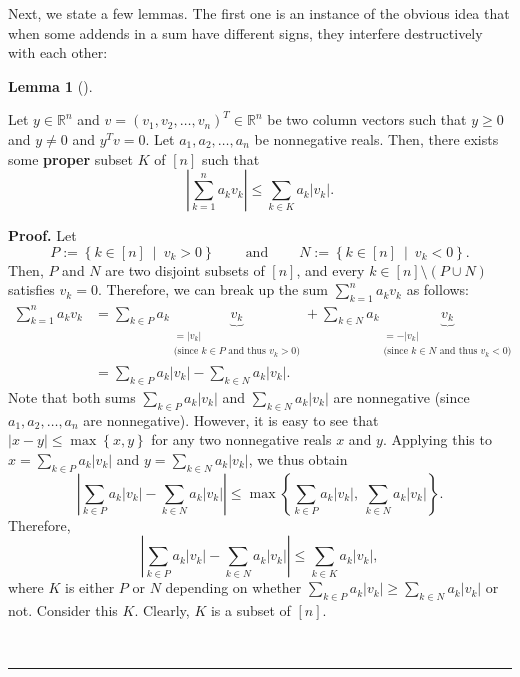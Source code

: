 \documentclass[numbers=enddot,12pt,final,onecolumn,notitlepage]{scrartcl}%
\numberwithin{exer}{subsection}
\theoremstyle{definition}
\newtheorem{lem}[theo]{Lemma}
\newenvironment{lemma}[1][]
{\begin{lem}[#1]\begin{leftbar}}
{\end{leftbar}\end{lem}}
\newenvironment{proof}[1][Proof]{\noindent\textbf{#1.} }{\ \rule{0.5em}{0.5em}}
\let\sumnonlimits\sum
\renewcommand{\sum}{\sumnonlimits\limits}
\begin{document}
Next, we state a few lemmas. The first one is an instance of the obvious idea
that when some addends in a sum have different signs, they interfere
destructively with each other:

\begin{lemma}
\label{lem.posmat.proper-subset}Let $y\in\mathbb{R}^{n}$ and $v=\left(
v_{1},v_{2},\ldots,v_{n}\right)  ^{T}\in\mathbb{R}^{n}$ be two column vectors
such that $y\geq0$ and $y\neq0$ and $y^{T}v=0$. Let $a_{1},a_{2},\ldots,a_{n}$
be nonnegative reals. Then, there exists some \textbf{proper} subset $K$ of
$\left[  n\right]  $ such that%
\[
\left\vert \sum_{k=1}^{n}a_{k}v_{k}\right\vert \leq\sum_{k\in K}%
a_{k}\left\vert v_{k}\right\vert .
\]

\end{lemma}

\begin{proof}
Let
\[
P:=\left\{  k\in\left[  n\right]  \ \mid\ v_{k}>0\right\}
\ \ \ \ \ \ \ \ \ \ \text{and}\ \ \ \ \ \ \ \ \ \ N:=\left\{  k\in\left[
n\right]  \ \mid\ v_{k}<0\right\}  .
\]
Then, $P$ and $N$ are two disjoint subsets of $\left[  n\right]  $, and every
$k\in\left[  n\right]  \setminus\left(  P\cup N\right)  $ satisfies $v_{k}=0$.
Therefore, we can break up the sum $\sum_{k=1}^{n}a_{k}v_{k}$ as follows:%
\begin{align}
\sum_{k=1}^{n}a_{k}v_{k}  &  =\sum_{k\in P}a_{k}\underbrace{v_{k}%
}_{\substack{=\left\vert v_{k}\right\vert \\\text{(since }k\in P\text{ and
thus }v_{k}>0\text{)}}}+\sum_{k\in N}a_{k}\underbrace{v_{k}}%
_{\substack{=-\left\vert v_{k}\right\vert \\\text{(since }k\in N\text{ and
thus }v_{k}<0\text{)}}}\nonumber\\
&  =\sum_{k\in P}a_{k}\left\vert v_{k}\right\vert -\sum_{k\in N}%
a_{k}\left\vert v_{k}\right\vert . \label{pf.lem.posmat.proper-subset.1}%
\end{align}
Note that both sums $\sum_{k\in P}a_{k}\left\vert v_{k}\right\vert $ and
$\sum_{k\in N}a_{k}\left\vert v_{k}\right\vert $ are nonnegative (since
$a_{1},a_{2},\ldots,a_{n}$ are nonnegative). However, it is easy to see that
$\left\vert x-y\right\vert \leq\max\left\{  x,y\right\}  $ for any two
nonnegative reals $x$ and $y$. Applying this to $x=\sum_{k\in P}%
a_{k}\left\vert v_{k}\right\vert $ and $y=\sum_{k\in N}a_{k}\left\vert
v_{k}\right\vert $, we thus obtain%
\[
\left\vert \sum_{k\in P}a_{k}\left\vert v_{k}\right\vert -\sum_{k\in N}%
a_{k}\left\vert v_{k}\right\vert \right\vert \leq\max\left\{  \sum_{k\in
P}a_{k}\left\vert v_{k}\right\vert ,\ \sum_{k\in N}a_{k}\left\vert
v_{k}\right\vert \right\}  .
\]
Therefore,%
\begin{equation}
\left\vert \sum_{k\in P}a_{k}\left\vert v_{k}\right\vert -\sum_{k\in N}%
a_{k}\left\vert v_{k}\right\vert \right\vert \leq\sum_{k\in K}a_{k}\left\vert
v_{k}\right\vert , \label{pf.lem.posmat.proper-subset.2}%
\end{equation}
where $K$ is either $P$ or $N$ depending on whether $\sum_{k\in P}%
a_{k}\left\vert v_{k}\right\vert \geq\sum_{k\in N}a_{k}\left\vert
v_{k}\right\vert $ or not. Consider this $K$. Clearly, $K$ is a subset of
$\left[  n\right]  $.


\end{proof}
\end{document}
